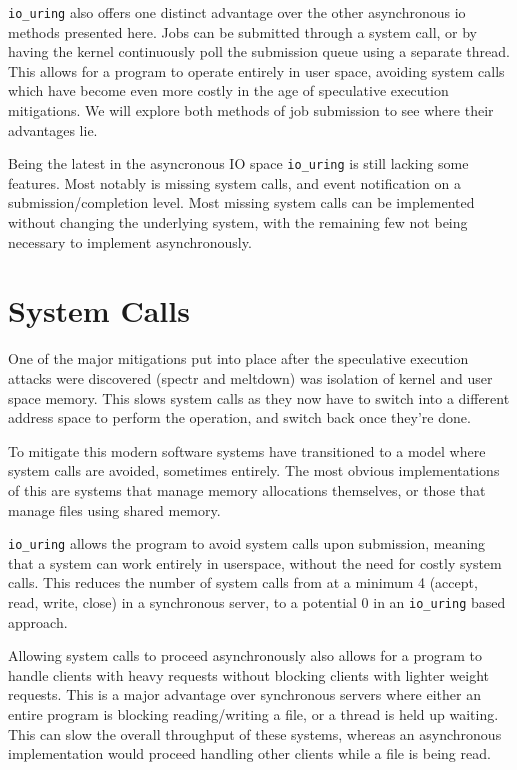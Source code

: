 \documentclass[letterpaper, 10pt, twocolumn]{article}
\begin{document}
\texttt{io\_uring} also offers one distinct advantage over the other asynchronous io methods presented here. Jobs can be submitted through a system call, or by having the kernel continuously poll the submission queue using a separate thread. This allows for a program to operate entirely in user space, avoiding system calls which have become even more costly in the age of speculative execution mitigations. We will explore both methods of job submission to see where their advantages lie.

Being the latest in the asyncronous IO space \texttt{io\_uring} is still lacking some features. Most notably is missing system calls, and event notification on a submission/completion level. Most missing system calls can be implemented without changing the underlying system, with the remaining few not being necessary to implement asynchronously.

\section{System Calls}
\label{sec:org4a102ef}
One of the major mitigations put into place after the speculative execution attacks were discovered (spectr and meltdown) was isolation of kernel and user space memory. This slows system calls as they now have to switch into a different address space to perform the operation, and switch back once they're done.

To mitigate this modern software systems have transitioned to a model where system calls are avoided, sometimes entirely. The most obvious implementations of this are systems that manage memory allocations themselves, or those that manage files using shared memory.

\texttt{io\_uring} allows the program to avoid system calls upon submission, meaning that a system can work entirely in userspace, without the need for costly system calls. This reduces the number of system calls from at a minimum 4 (accept, read, write, close) in a synchronous server, to a potential 0 in an \texttt{io\_uring} based approach.

Allowing system calls to proceed asynchronously also allows for a program to handle clients with heavy requests without blocking clients with lighter weight requests. This is a major advantage over synchronous servers where either an entire program is blocking reading/writing a file, or a thread is held up waiting. This can slow the overall throughput of these systems, whereas an asynchronous implementation would proceed handling other clients while a file is being read.
\end{document}
